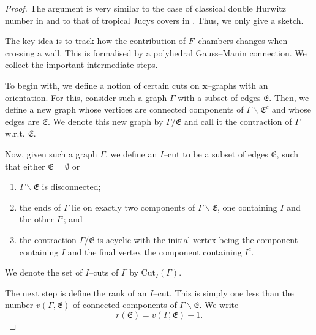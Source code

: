 \documentclass[10pt,a4paper,oneside,no-math,reqno]{amsart}%
\theoremstyle{plain}
\theoremstyle{definition}
\theoremstyle{remark}
\numberwithin{equation}{section}
\newcommand{\1}{\mathds{1}}
\newcommand{\<}{\langle}
\renewcommand{\>}{\rangle}
\begin{document}
\begin{proof}
    The argument is very similar to the case of classical double Hurwitz number in \cite{CJM11} and to that of tropical Jucys covers in \cite[section 4]{HL20}. Thus, we only give a sketch.

    The key idea is to track how the contribution of $F$--chambers changes when crossing a wall. This is formalised by a polyhedral Gauss--Manin connection. We collect the important intermediate steps.

    To begin with, we define a notion of certain cuts on $\mathbf{x}$--graphs with an orientation. For this, consider such a graph $\Gamma$ with a subset of edges $\mathfrak{E}$. Then, we define a new graph whose vertices are connected components of $\Gamma\backslash\mathfrak{E}^c$ and whose edges are $\mathfrak{E}$. We denote this new graph by $\Gamma/\mathfrak{E}$ and call it the contraction of $\Gamma$ w.r.t. $\mathfrak{E}$.
    
    Now, given such a graph $\Gamma$, we define an $I$--cut to be a subset of edges $\mathfrak{E}$, such that either $\mathfrak{E}=\emptyset$ or
    
    \begin{enumerate}
        \item $\Gamma\backslash \mathfrak{E}$ is disconnected;
        \item the ends of $\Gamma$ lie on exactly two components of $\Gamma\backslash \mathfrak{E}$, one containing $I$ and the other $I^c$; and
        \item the contraction $\Gamma/\mathfrak{E}$ is acyclic with the initial vertex being the component containing $I$ and the final vertex the component containing $I^c$.
    \end{enumerate}

    We denote the set of $I$--cuts of $\Gamma$ by $\mathrm{Cut}_I(\Gamma)$.

    The next step is define the rank of an $I$--cut. This is simply one less than the number $v(\Gamma,\mathfrak{E})$ of connected components of $\Gamma\backslash\mathfrak{E}$. We write
    \begin{equation}
        r(\mathfrak{E})=v(\Gamma,\mathfrak{E})-1.
    \end{equation}


\end{proof}
\end{document}
